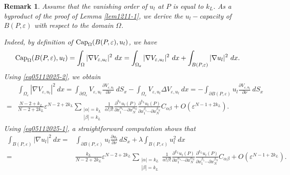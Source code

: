 \documentclass[11pt,reqno]{article}
\newtheorem{rem}[teo]{Remark}
\numberwithin{equation}{section}
\newcommand\e\varepsilon
\renewcommand\O\Omega
\begin{document}
    \begin{rem} Assume that the vanishing order of $u_l$ at $P$ is equal to $k_L$. As a byproduct of the proof of Lemma \ref{lem1211-1}, we derive the $u_l-$capacity of $B(P,\e)$ with respect to the domain $\O$.

    Indeed, by  definition of  $\hbox{Cap}_\O(B(P,\e),u_l)$, we have 
    $$
    \hbox{Cap}_\O(B(P,\e),u_l)=\int_\O|\nabla V_{\e,u_l}|^2\ dx=\int_{\O_\e}|\nabla V_{\e,u_l}|^2\ dx+ \int_{B(P,\e)}|\nabla u_l|^2\ dx.
    $$
        Using \eqref{eq05112025-2}, we  obtain 
        \begin{equation}
            \begin{aligned}
               & \int_{\O_\e}|\nabla V_{\e,u_l}|^2\ dx=\int_{\partial\O_\e}V_{\e,u_l}\frac{\partial V_{\e,u_l}}{\partial\nu}\ dS_x-\int_{\O_\e}V_{\e,u_l}\Delta V_{\e,u_l}\ dx=-\int_{\partial B(P,\e)}u_l\frac{\partial V_{\e,u_l}}{\partial\nu}\ dS_x\\
            =&\frac{N-2+{ k_L}}{N-2+2 k_L}\e^{N-2+2{ k_L}}	\sum_{\substack{|\alpha|={ k_L}\\
           |\beta|={ k_L}}}\frac{1}{\alpha!\beta!}\frac{\partial^{{ k_L}} u_l (P)}{\partial x_{1}^{\alpha_1}\cdots\partial x_{N}^{\alpha_N}}\frac{\partial^{{ k_L}} u_l (P)}{\partial x_{1}^{\beta_1}\cdots\partial x_{N}^{\beta_N}}C_{\alpha\beta}+O(\e^{N-1+2{ k_L}}).
            \end{aligned}
        \end{equation}
     Using \eqref{eq05112025-1},   a straightforward computation shows that
        \begin{equation}
        \begin{aligned}
            \int_{B(P,\e)}|\nabla u_l|^2\ dx=&\int_{\partial B(P,\e)}u_l\frac{\partial u_l}{\partial\nu}\ dS_x+\lambda\int_{B(P,\e)} u_l^2\ dx\\
            =&\frac{ k_L}{N-2+2 k_L}\e^{N-2+2{ k_L}}	\sum_{\substack{|\alpha|={ k_L}\\
           |\beta|={ k_L}}}\frac{1}{\alpha!\beta!}\frac{\partial^{{ k_L}} u_l (P)}{\partial x_{1}^{\alpha_1}\cdots\partial x_{N}^{\alpha_N}}\frac{\partial^{{ k_L}} u_l (P)}{\partial x_{1}^{\beta_1}\cdots\partial x_{N}^{\beta_N}}C_{\alpha\beta}+O(\e^{N-1+2{ k_L}}).

\end{aligned}
\end{equation}
\end{rem}
\end{document}

